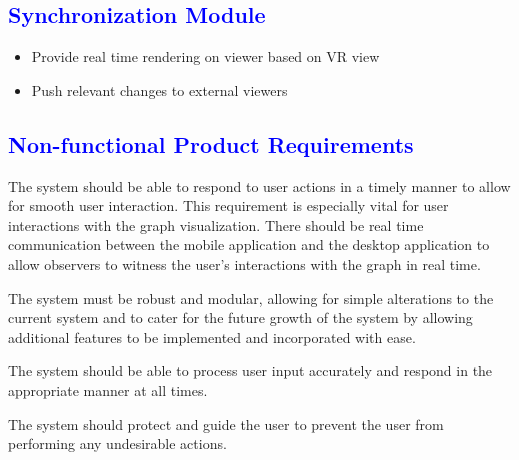 \documentclass[12pt]{article}
\begin{document}
\begin{flushleft}
	\textcolor{blue}{\subsection{Synchronization Module}}	
	\begin{flushleft}
	\begin{itemize}
	\item Provide real time rendering on viewer based on VR view
	\item Push relevant changes to external viewers
	\end{itemize}	
	\end{flushleft}

\end{flushleft}

\textcolor{blue}{\section{Non-functional Product Requirements}}
\begin{flushleft}
The system should be able to respond to user actions in a timely manner to allow for smooth user interaction. This requirement is especially vital for user interactions with the graph visualization. There should be real time communication between the mobile application and the desktop application to allow observers to witness the user’s interactions with the graph in real time.

\bigskip

The system must be robust and modular, allowing for simple alterations to the current system and to cater for the future growth of the system by allowing additional features to be implemented and incorporated with ease.

\bigskip

The system should be able to process user input accurately and respond in the appropriate manner at all times.

\bigskip

The system should protect and guide the user to prevent the user from performing any undesirable actions. 

\end{flushleft}
\end{document}
